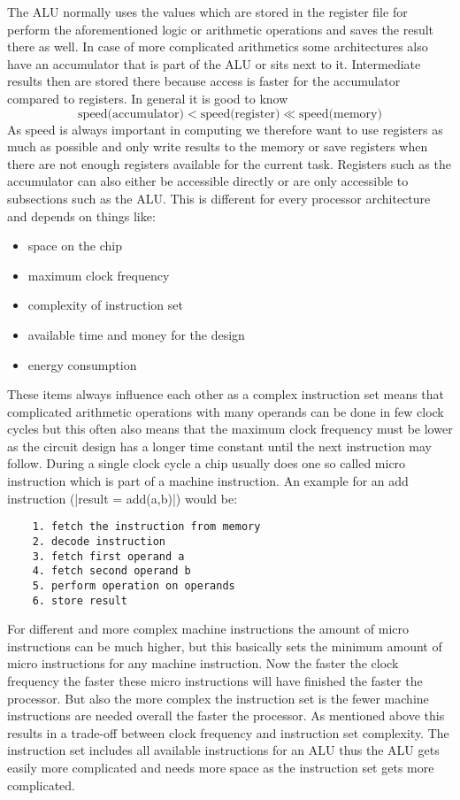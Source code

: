 The ALU normally uses the values which are stored in the register file for perform the aforementioned logic or arithmetic operations and saves the result there as well.
In case of more complicated arithmetics some architectures also have an accumulator that is part of the ALU or sits next to it.
Intermediate results then are stored there because access is faster for the accumulator compared to registers.
In general it is good to know
\begin{equation}
    \text{speed(accumulator)} < \text{speed(register)} \ll \text{speed(memory)}
\end{equation}
As speed is always important in computing we therefore want to use registers as much as possible and only write results to the memory or save registers when there are not enough registers available for the current task.
Registers such as the accumulator can also either be accessible directly or are only accessible to subsections such as the ALU.
This is different for every processor architecture and depends on things like:
\begin{itemize}
    \item space on the chip
    \item maximum clock frequency
    \item complexity of instruction set
    \item available time and money for the design
    \item energy consumption
\end{itemize}

These items always influence each other as a complex instruction set means that complicated arithmetic operations with many operands can be done in few clock cycles but this often also means that the maximum clock frequency must be lower as the circuit design has a longer time constant until the next instruction may follow.
During a single clock cycle a chip usually does one so called micro instruction which is part of a machine instruction.
An example for an add instruction (|result = add(a,b)|) would be:
\begin{lstlisting}
    1. fetch the instruction from memory
    2. decode instruction
    3. fetch first operand a
    4. fetch second operand b
    5. perform operation on operands
    6. store result
\end{lstlisting}
For different and more complex machine instructions the amount of micro instructions can be much higher, but this basically sets the minimum amount of micro instructions for any machine instruction.
Now the faster the clock frequency the faster these micro instructions will have finished the faster the processor.
But also the more complex the instruction set is the fewer machine instructions are needed overall the faster the processor.
As mentioned above this results in a trade-off between clock frequency and instruction set complexity.
The instruction set includes all available instructions for an ALU thus the ALU gets easily more complicated and needs more space as the instruction set gets more complicated.


